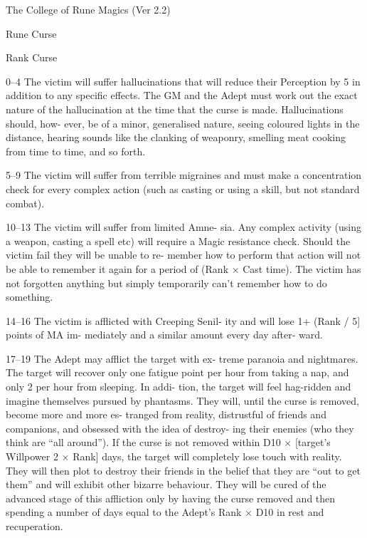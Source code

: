 \begin{Chapter}{The College of Rune Magics (Ver 2.2)}
\begin{spell}[S-6]{Rune Curse }
\begin{effects}
Rank Curse 

0–4  The  victim  will  suffer  hallucinations  that  will 
reduce  their  Perception  by  5  in  addition  to  any 
specific effects. The GM and the Adept must work 
out the exact nature of the hallucination at the time 
that the curse is made. Hallucinations should, how-
ever,  be  of  a  minor,  generalised  nature,  seeing 
coloured lights in the distance, hearing sounds like 
the  clanking  of  weaponry,  smelling  meat  cooking 
from time to time, and so forth. 

5–9  The  victim will  suffer  from terrible  migraines 
and  must  make  a  concentration  check  for  every 
complex action (such as casting or using a skill, but 
not standard combat). 

10–13  The  victim  will  suffer  from  limited  Amne-
sia. Any complex activity (using a weapon, casting 
a  spell  etc)  will  require  a  Magic  resistance  check. 
Should  the  victim  fail  they  will  be  unable  to  re-
member how to perform that action will not be able 
to remember it again for a period of  (Rank × Cast 
time).  The  victim  has  not  forgotten  anything  but 
simply  temporarily  can’t  remember  how  to  do 
something. 

14–16 The victim is afflicted with Creeping Senil-
ity  and  will  lose  1+  (Rank  /  5]  points  of  MA  im-
mediately  and  a  similar  amount  every  day  after-
ward. 



17–19  The  Adept  may  afflict  the  target  with  ex-
treme  paranoia  and  nightmares.  The  target  will 
recover only one fatigue point per hour from taking 
a nap, and only 2 per hour from sleeping. In addi-
tion,  the  target  will  feel  hag-ridden  and  imagine 
themselves pursued by phantasms. They will, until 
the  curse  is  removed,  become  more  and  more  es-
tranged  from  reality,  distrustful  of  friends  and 
companions, and obsessed with the idea of destroy-
ing their  enemies  (who they 
think  are  “all 
around”). If the curse is not removed within D10 × 
[target’s Willpower 2 × Rank] days, the target will 
completely  lose  touch  with  reality.  They  will  then 
plot  to  destroy  their  friends  in  the  belief  that  they 
are “out to get them” and will exhibit other bizarre 
behaviour.  They  will  be  cured  of  the  advanced 
stage  of  this  affliction  only  by  having  the  curse 
removed and then spending a number of days equal 
to  the  Adept’s  Rank  ×  D10  in  rest  and  recuperation. 



\end{effects}
\end{spell}
\end{Chapter}
